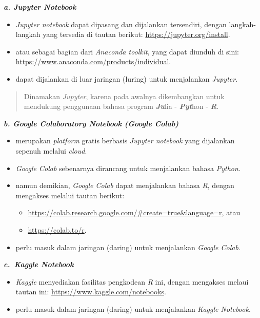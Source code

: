 \documentclass[
  12pt,
  a4paper,
]{scrbook}
\providecommand{\tightlist}{%
  \setlength{\itemsep}{0pt}\setlength{\parskip}{0pt}}
\begin{document}
\textbf{\emph{a. Jupyter Notebook}}

\begin{itemize}
\tightlist
\item
  \emph{Jupyter notebook} dapat dipasang dan dijalankan tersendiri,
  dengan langkah-langkah yang tersedia di tautan berikut:
  \url{https://jupyter.org/install}.
\item
  atau sebagai bagian dari \emph{Anaconda toolkit}, yang dapat diunduh
  di sini: \url{https://www.anaconda.com/products/individual}.
\item
  dapat dijalankan di luar jaringan (luring) untuk menjalankan
  \emph{Jupyter}.
\end{itemize}

\begin{quote}
Dinamakan \emph{Jupyter}, karena pada awalnya dikembangkan untuk
mendukung penggunaan bahasa program \textbf{\emph{Ju}}lia -
\textbf{\emph{Pyt}}hon - \textbf{\emph{R}}.
\end{quote}

\newpage

\textbf{\emph{b. Google Colaboratory Notebook (Google Colab)}}

\begin{itemize}
\tightlist
\item
  merupakan \emph{platform} gratis berbasis \emph{Jupyter notebook} yang
  dijalankan sepenuh melalui \emph{cloud}.
\item
  \emph{Google Colab} sebenarnya dirancang untuk menjalankan bahasa
  \emph{Python}.
\item
  namun demikian, \emph{Google Colab} dapat menjalankan bahasa \emph{R},
  dengan mengakses melalui tautan berikut:

  \begin{itemize}
  \tightlist
  \item
    \url{https://colab.research.google.com/\#create=true\&language=r},
    atau
  \item
    \url{https://colab.to/r}.
  \end{itemize}
\item
  perlu masuk dalam jaringan (daring) untuk menjalankan \emph{Google
  Colab}.
\end{itemize}

\textbf{\emph{c.~Kaggle Notebook}}

\begin{itemize}
\tightlist
\item
  \emph{Kaggle} menyediakan fasilitas pengkodean \emph{R} ini, dengan
  mengakses melaui tautan ini: \url{https://www.kaggle.com/notebooks}.
\item
  perlu masuk dalam jaringan (daring) untuk menjalankan \emph{Kaggle
  Notebook}.
\end{itemize}
\end{document}
